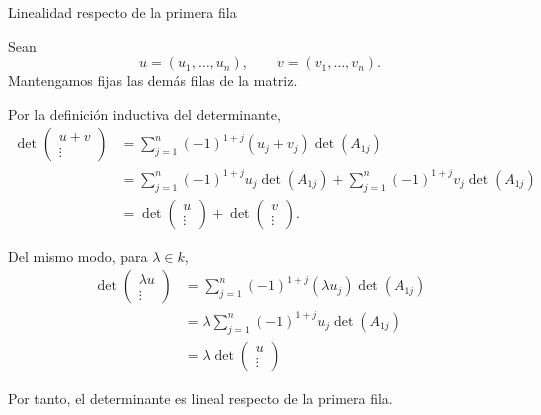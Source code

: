 \begin{frame}[allowframebreaks, t]{Linealidad respecto de la primera fila}

Sean
\[
u=(u_1,\ldots,u_n),\qquad
v=(v_1,\ldots,v_n).
\]
Mantengamos fijas las demás filas de la matriz.

\medskip

Por la definición inductiva del determinante,
\[
\begin{aligned}
\det
\left(
\begin{array}{c}
u+v\\
\hline
\vdots
\end{array}
\right)
&=
\sum_{j=1}^n
(-1)^{1+j}(u_j+v_j)\det(A_{1j})\\
&=
\sum_{j=1}^n
(-1)^{1+j}u_j\det(A_{1j})
+
\sum_{j=1}^n
(-1)^{1+j}v_j\det(A_{1j})\\
&=
\det
\left(
\begin{array}{c}
u\\
\hline
\vdots
\end{array}
\right)
+
\det
\left(
\begin{array}{c}
v\\
\hline
\vdots
\end{array}
\right).
\end{aligned}
\]

Del mismo modo, para \(\lambda\in k\),
\[
\begin{aligned}
\det
\left(
\begin{array}{c}
\lambda u\\
\hline
\vdots
\end{array}
\right)
&=
\sum_{j=1}^n
(-1)^{1+j}(\lambda u_j)\det(A_{1j})\\
&=
\lambda\sum_{j=1}^n
(-1)^{1+j}u_j\det(A_{1j})\\
&=
\lambda\det
\left(
\begin{array}{c}
u\\
\hline
\vdots
\end{array}
\right)
\end{aligned}
\]

Por tanto, el determinante es lineal respecto de la primera fila.

\end{frame}

